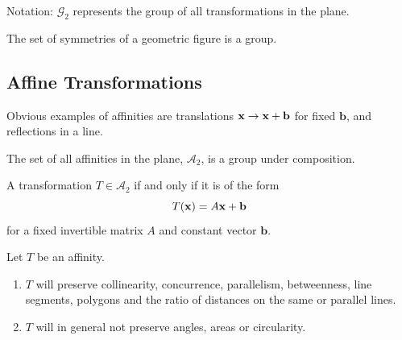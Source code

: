 Notation: \(\mathcal{G}_2\) represents the group of all transformations in the plane.



\begin{corollary}
    The set of symmetries of a geometric figure is a group.
\end{corollary}

\subsection{Affine Transformations}


Obvious examples of affinities are translations \(\mathbf{x} \to \mathbf{x} + \mathbf{b}\) for fixed \(\mathbf{b}\), and reflections in a line.

\begin{theorem}
    The set of all affinities in the plane, \(\mathcal{A}_2\), is a group under composition.
\end{theorem}

\begin{theorem}
    A transformation \(T \in \mathcal{A}_2\) if and only if it is of the form
    \[T(\mathbf{x}) = A\mathbf{x} + \mathbf{b}\]
    for a fixed invertible matrix \(A\) and constant vector \(\mathbf{b}\).
\end{theorem}

\begin{theorem}
    Let \(T\) be an affinity.
    \begin{enumerate}[label=\alph*)]
        \item \(T\) will preserve collinearity, concurrence, parallelism, betweenness, line segments, polygons and the ratio of distances on the same or parallel lines.
        \item \(T\) will in general not preserve angles, areas or circularity.
    \end{enumerate}
\end{theorem}

